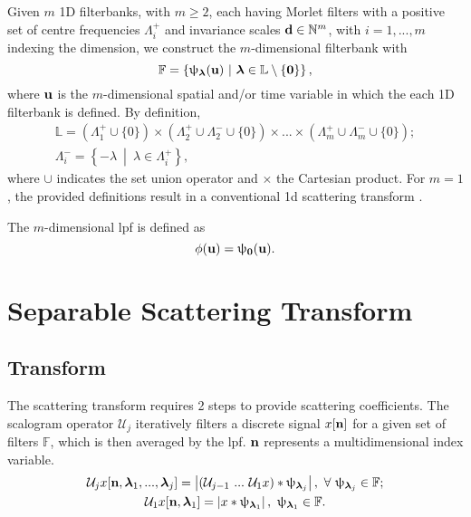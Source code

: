 Given $m$ 1D filterbanks, with $m \ge 2$, each having Morlet filters with a positive set of centre frequencies $\Lambda_i^+$ and invariance scales $\boldsymbol{\mathbf{d}} \in \mathbb{N}^m$, with $i = 1, ..., m$ indexing the dimension, we construct the $m$-dimensional filterbank with 
\begin{equation}
    \mathbb{F} = \left\{ \uppsi_{\boldsymbol{\mathbf{\lambda}} }(\mathbf{u}) \ \middle| \ \boldsymbol{\mathbf{\lambda}} \in \mathbb{L} \setminus \{\boldsymbol{\mathbf{0}}\} \right\},
\end{equation}
where $\boldsymbol{\mathbf{u}}$ is the $m$-dimensional spatial and/or time variable in which the each 1D filterbank is defined.  By definition, 
\begin{gather}
    \mathbb{L} = (\Lambda_1^+ \!\cup\! \{0\})\!\times\! (\Lambda_2^+ \!\cup\! \Lambda_2^- \!\cup \!\{0\}) \!\times\! ... \!\times\! (\Lambda_m^+ \!\cup\! \Lambda_m^- \!\cup\! \{0\}); \\
    \Lambda_i^- = \left\{-\lambda \ \middle| \ \lambda \in \Lambda_i^+\right\},
\end{gather}
where $\cup$ indicates the set union operator and $\times$ the Cartesian product. For $m=1$, the provided definitions result in a conventional \ac{1d} scattering transform \cite{1dscattering1}.

The $m$-dimensional \ac{lpf} is defined as 
\begin{equation}
    \phi(\boldsymbol{\mathbf{u}}) = \uppsi_{\boldsymbol{\mathbf{0}}}(\boldsymbol{\mathbf{u}}).
\end{equation}

\section{Separable Scattering Transform} \label{sec:wst}

\subsection{Transform}

The scattering transform requires 2 steps to provide scattering coefficients. The scalogram operator $\mathcal{U}_j$ iteratively filters a discrete signal $x[\boldsymbol{\mathbf{n}}]$ for a given set of filters $\mathbb{F}$, which is then averaged by the \ac{lpf}. $\boldsymbol{\mathbf{n}}$ represents a multidimensional index variable.
\begin{gather}
    \mathcal{U}_j x [\boldsymbol{\mathbf{n}}, \boldsymbol{\mathbf{\lambda}}_1, ..., \boldsymbol{\mathbf{\lambda}}_j] = \left|\left(\mathcal{U}_{j-1} \ ...\  \mathcal{U}_1 x\right) * \uppsi_{\boldsymbol{\mathbf{\lambda}}_j} \right|, \ \forall \ \uppsi_{\boldsymbol{\mathbf{\lambda}}_j} \in \mathbb{F}; \\
     \mathcal{U}_1 x [\boldsymbol{\mathbf{n}}, \boldsymbol{\mathbf{\lambda}}_1] =  \left| x * \uppsi_{\boldsymbol{\mathbf{\lambda}}_1} \right| , \ \uppsi_{\boldsymbol{\mathbf{\lambda}}_1} \in \mathbb{F}.
\end{gather}

